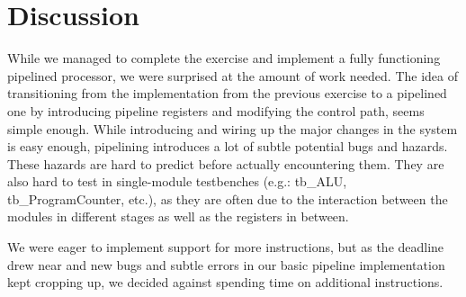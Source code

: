 \chapter{Discussion}

While we managed to complete the exercise and implement a fully functioning pipelined processor, we were surprised at the amount of work needed.
The idea of transitioning from the implementation from the previous exercise to a pipelined one by introducing pipeline registers and modifying the control path, seems simple enough.
While introducing and wiring up the major changes in the system is easy enough, pipelining introduces a lot of subtle potential bugs and hazards.
These hazards are hard to predict before actually encountering them.
They are also hard to test in single-module testbenches (e.g.: tb\_ALU, tb\_ProgramCounter, etc.), as they are often due to the interaction between the modules in different stages as well as the registers in between.

We were eager to implement support for more instructions, but as the deadline drew near and new bugs and subtle errors in our basic pipeline implementation kept cropping up, we decided against spending time on additional instructions.
